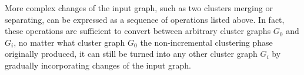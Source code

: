 More complex changes of the input graph, such as two clusters merging or separating, can be expressed as a sequence of operations listed above. In fact, these operations are sufficient to convert between arbitrary cluster graphs $G_0$ and $G_i$, \ie{} no matter what cluster graph $G_0$ the non-incremental clustering phase originally produced, it can still be turned into any other cluster graph $G_i$ by gradually incorporating changes of the input graph.
